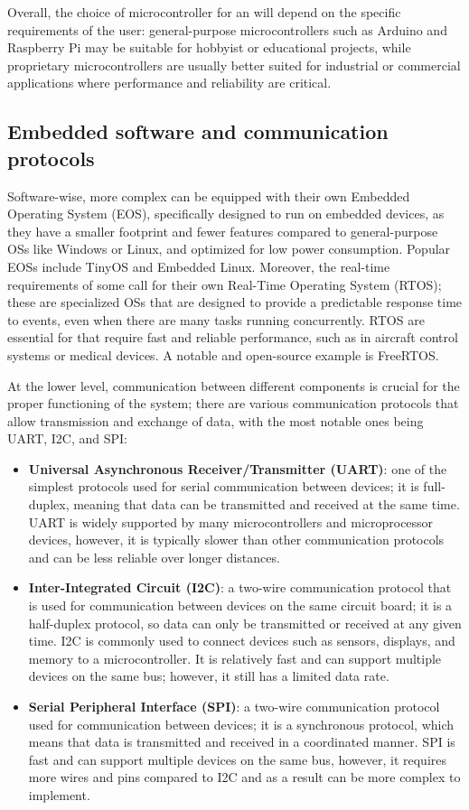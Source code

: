 Overall, the choice of microcontroller for an \es will depend on the specific requirements of the user: general-purpose microcontrollers such as Arduino and Raspberry Pi may be suitable for hobbyist or educational projects, while proprietary microcontrollers are usually better suited for industrial or commercial applications where performance and reliability are critical.


\subsection{Embedded software and communication protocols}
Software-wise, more complex \ess can be equipped with their own Embedded Operating System (EOS), specifically designed to run on embedded devices, as they have a smaller footprint and fewer features compared to general-purpose OSs like Windows or Linux, and optimized for low power consumption. Popular EOSs include TinyOS and Embedded Linux.
Moreover, the real-time requirements of some \ess call for their own Real-Time Operating System (RTOS); these are specialized OSs that are designed to provide a predictable response time to events, even when there are many tasks running concurrently. RTOS are essential for \ess that require fast and reliable performance, such as in aircraft control systems or medical devices. A notable and open-source example is FreeRTOS. 

At the lower level, communication between different components is crucial for the proper functioning of the system; there are various communication protocols that allow transmission and exchange of data, with the most notable ones being UART, I2C, and SPI:
\begin{itemize}
    \item \textbf{Universal Asynchronous Receiver/Transmitter (UART)}: one of the simplest protocols used for serial communication between devices; it is full-duplex, meaning that data can be transmitted and received at the same time. UART is widely supported by many microcontrollers and microprocessor devices, however, it is typically slower than other communication protocols and can be less reliable over longer distances.
    \item \textbf{Inter-Integrated Circuit (I2C)}: a two-wire communication protocol that is used for communication between devices on the same circuit board; it is a half-duplex protocol, so data can only be transmitted or received at any given time. I2C is commonly used to connect devices such as sensors, displays, and memory to a microcontroller. It is relatively fast and can support multiple devices on the same bus; however, it still has a limited data rate.
    \item \textbf{Serial Peripheral Interface (SPI)}: a two-wire communication protocol used for communication between devices; it is a synchronous protocol, which means that data is transmitted and received in a coordinated manner. SPI is fast and can support multiple devices on the same bus, however, it requires more wires and pins compared to I2C and as a result can be more complex to implement.
\end{itemize} 


